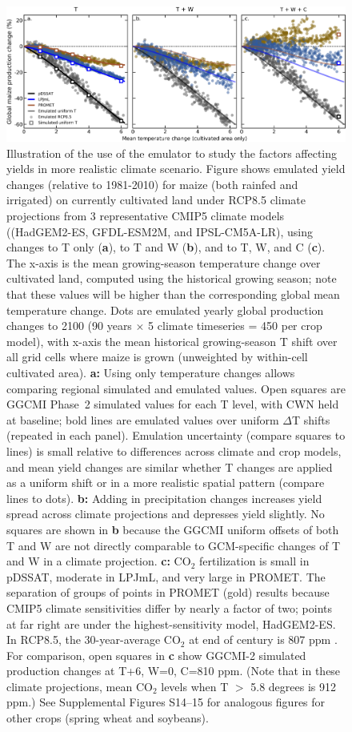 \documentclass[gmdd]{copernicus} %
\begin{document}
\begin{figure}[ht]
    \centering
    \includegraphics[width = 16.3cm]{figures/global_em_maize.png}
    \caption{
    Illustration of the use of the emulator to study the factors affecting yields in more realistic climate scenario.
	Figure shows emulated yield changes (relative to 1981-2010) for maize (both rainfed and irrigated) on currently cultivated land under RCP8.5 climate projections from 3 representative CMIP5 climate models ((HadGEM2-ES, GFDL-ESM2M, and IPSL-CM5A-LR), using changes to T only (\textbf{a}), to T and W (\textbf{b}), and to T, W, and C (\textbf{c}).  
    The x-axis is the mean growing-season temperature change over cultivated land, computed using the historical growing season; note that these values will be higher than the corresponding global mean temperature change.
    Dots are emulated yearly global production changes to 2100 (90 years $\times$ 5 climate timeseries = 450 per crop model), with x-axis the mean historical growing-season T shift over all grid cells where maize is grown (unweighted by within-cell cultivated area).
    \textbf{a:} Using only temperature changes allows comparing regional simulated and emulated values. 
    Open squares are GGCMI Phase~2 simulated values for each T level, with CWN held at baseline; bold lines are emulated values over uniform $\Delta$T shifts (repeated in each panel). Emulation uncertainty (compare squares to lines) is small relative to differences across climate and crop models, and mean yield changes are similar whether T changes are applied as a uniform shift or in a more realistic spatial pattern (compare lines to dots). 
    \textbf{b:} Adding in precipitation changes increases yield spread across climate projections and depresses yield slightly.  No squares are shown in \textbf{b} because the GGCMI uniform offsets of both T and W are not directly comparable to GCM-specific changes of T and W in a climate projection.
    \textbf{c:}  CO$_2$ fertilization is small in pDSSAT, moderate in LPJmL, and very large in PROMET. 
    The separation of groups of points in PROMET (gold) results because CMIP5 climate sensitivities differ by nearly a factor of two; points at far right are under the highest-sensitivity model, HadGEM2-ES.
       In RCP8.5, the 30-year-average CO$_2$ at end of century is 807 ppm \citep{riahi2011rcp}. 
	For comparison, open squares in \textbf{c} show GGCMI-2 simulated production changes at T+6, W=0, C=810 ppm. (Note that  in these climate projections, mean CO$_2$ levels when T $>$ 5.8 degrees is 912 ppm.)
	See Supplemental Figures S14--15 for analogous figures for other crops (spring wheat and soybeans).
    }
    \label{fig:globe_em}
\end{figure}
\end{document}
